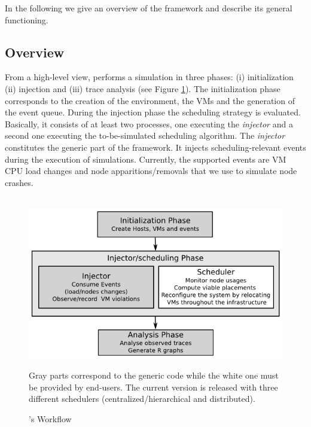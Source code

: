 In the following we give an overview of the framework and describe its
general functioning.%

\subsection{Overview}
\label{sec:overview}

From a high-level view, \vmps performs a simulation in three phases:
(i) initialization (ii) injection and (iii) trace analysis (see Figure
\ref{fig:workflow}).  The
initialization phase corresponds to the creation of the environment,
the VMs and the generation of the event queue. During the injection
phase the scheduling strategy is evaluated. Basically, it consists of
at least two \sg processes, one executing the \emph{injector} and a
second one executing the to-be-simulated scheduling algorithm.  The
\emph{injector} constitutes the generic part of the framework. It
injects scheduling-relevant events during the execution of
simulations.  Currently, the supported events are VM CPU load changes
and node apparitions/removals that we use to simulate node crashes.

\begin{figure}
  {\centering ~\includegraphics[width=.95\linewidth]{figures/VMPlaceS-workflow.png}}
  \caption{\vmps's Workflow}
  \label{fig:workflow}
{\small Gray parts correspond to the generic code while the white one
  must be provided by end-users. The current version is released with
  three different schedulers (centralized/hierarchical and distributed).}
\end{figure}


